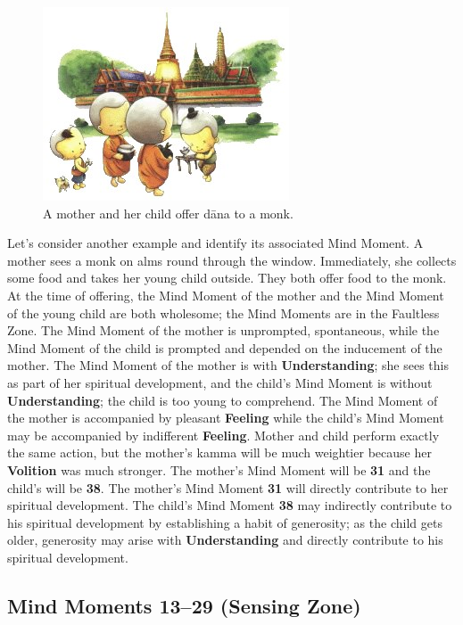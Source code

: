 \pagebreak

\begin{figure} [H]
\begin{center}
\includegraphics[width=0.4\linewidth]{./Diagrams/Dana}
\end{center}
\caption{A mother and her child offer dāna to a monk.}
\label{fig:Dana}
\end{figure}

Let’s consider another example and identify its associated Mind Moment. A mother sees a monk on alms round through the window. Immediately, she collects some food and takes her young child outside. They both offer food to the monk. At the time of offering, the Mind Moment of the mother and the Mind Moment of the young child are both wholesome; the Mind Moments are in the Faultless Zone. The Mind Moment of the mother is unprompted, spontaneous, while the Mind Moment of the child is prompted and depended on the inducement of the mother. The Mind Moment of the mother is with \textbf{Understanding}; she sees this as part of her spiritual development, and the child’s Mind Moment is without \textbf{Understanding}; the child is too young to comprehend. The Mind Moment of the mother is accompanied by pleasant \textbf{Feeling} while the child’s Mind Moment may be accompanied by indifferent \textbf{Feeling}. Mother and child perform exactly the same action, but the mother’s kamma will be much weightier because her \textbf{Volition} was much stronger. The mother’s Mind Moment will be \textbf{31} and the child’s will be \textbf{38}. The mother’s Mind Moment \textbf{31} will directly contribute to her spiritual development. The child’s Mind Moment \textbf{38} may indirectly contribute to his spiritual development by establishing a habit of generosity; as the child gets older, generosity may arise with \textbf{Understanding} and directly contribute to his spiritual development.

\pagebreak

\subsection*{Mind Moments 13--29 (Sensing Zone)}

